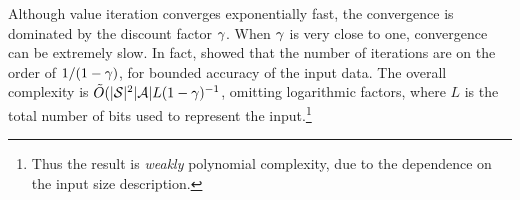Although value iteration converges exponentially fast, the convergence
is dominated by the discount factor $\gamma$. When $\gamma$ is very
close to one, convergence can be extremely slow.  In fact,
\citet{tseng1990solving} showed that the number of iterations are on
the order of $1 / (1 - \gamma)$, for bounded accuracy of the input
data. The overall complexity is
$\tilde{O}(|{\mathcal{S}}|^2 |{\mathcal{A}}| L (1 - \gamma)^{-1}$, omitting logarithmic
factors, where $L$ is the total number of bits used to represent the
input.\footnote{Thus the result is \emph{weakly} polynomial complexity, due to the dependence on the input size description.}
